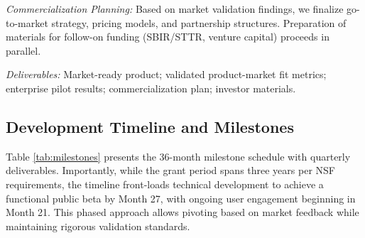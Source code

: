 \documentclass[11pt]{article}
\begin{document}
\textit{Commercialization Planning:} Based on market validation findings, we finalize go-to-market strategy, pricing models, and partnership structures. Preparation of materials for follow-on funding (SBIR/STTR, venture capital) proceeds in parallel.

\textit{Deliverables:} Market-ready product; validated product-market fit metrics; enterprise pilot results; commercialization plan; investor materials.

\vspace*{-8pt}
\subsection{Development Timeline and Milestones}
\vspace*{-8pt}
Table \ref{tab:milestones} presents the 36-month milestone schedule with quarterly deliverables. Importantly, while the grant period spans three years per NSF requirements, the timeline front-loads technical development to achieve a functional public beta by Month 27, with ongoing user engagement beginning in Month 21. This phased approach allows pivoting based on market feedback while maintaining rigorous validation standards.
\end{document}
